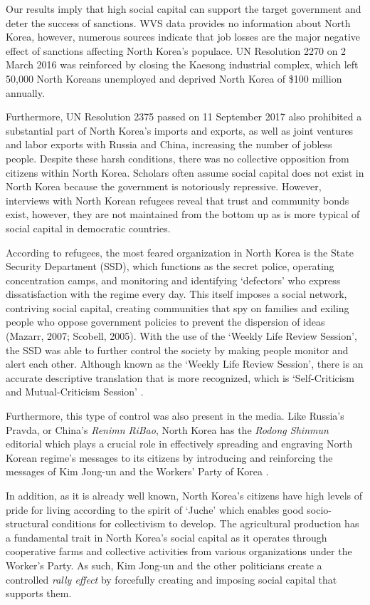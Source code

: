 \documentclass[12pt,]{article}
\begin{document}
Our results imply that high social capital can support the target
government and deter the success of sanctions. WVS data provides no
information about North Korea, however, numerous sources indicate that
job losses are the major negative effect of sanctions affecting North
Korea's populace. UN Resolution 2270 on 2 March 2016 was reinforced by
closing the Kaesong industrial complex, which left 50,000 North Koreans
unemployed and deprived North Korea of \$100 million annually.

Furthermore, UN Resolution 2375 passed on 11 September 2017 also
prohibited a substantial part of North Korea's imports and exports, as
well as joint ventures and labor exports with Russia and China,
increasing the number of jobless people. Despite these harsh conditions,
there was no collective opposition from citizens within North Korea.
Scholars often assume social capital does not exist in North Korea
because the government is notoriously repressive. However, interviews
with North Korean refugees reveal that trust and community bonds exist,
however, they are not maintained from the bottom up as is more typical
of social capital in democratic countries.

According to refugees, the most feared organization in North Korea is
the State Security Department (SSD), which functions as the secret
police, operating concentration camps, and monitoring and identifying
`defectors' who express dissatisfaction with the regime every day. This
itself imposes a social network, contriving social capital, creating
communities that spy on families and exiling people who oppose
government policies to prevent the dispersion of ideas (Mazarr, 2007;
Scobell, 2005). With the use of the `Weekly Life Review Session', the
SSD was able to further control the society by making people monitor and
alert each other. Although known as the `Weekly Life Review Session',
there is an accurate descriptive translation that is more recognized,
which is `Self-Criticism and Mutual-Criticism Session'
\citep{lankov2013a}.

Furthermore, this type of control was also present in the media. Like
Russia's Pravda, or China's \emph{Renimn RiBao}, North Korea has the
\emph{Rodong Shinmun} editorial which plays a crucial role in
effectively spreading and engraving North Korean regime's messages to
its citizens by introducing and reinforcing the messages of Kim Jong-un
and the Workers' Party of Korea \citep{ford2018a}.

In addition, as it is already well known, North Korea's citizens have
high levels of pride for living according to the spirit of `Juche' which
enables good socio-structural conditions for collectivism to develop.
The agricultural production has a fundamental trait in North Korea's
social capital as it operates through cooperative farms and collective
activities from various organizations under the Worker's Party. As such,
Kim Jong-un and the other politicians create a controlled \emph{rally
effect} by forcefully creating and imposing social capital that supports
them.
\end{document}

